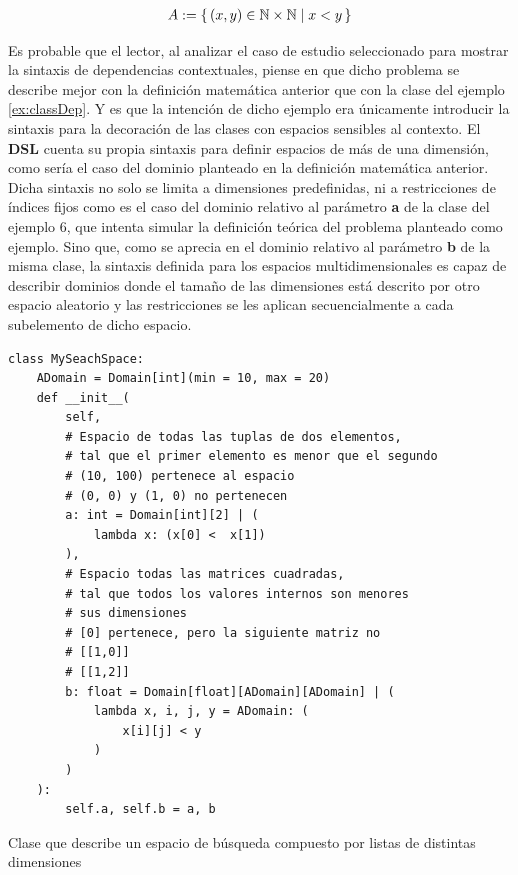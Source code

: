\begin{align*}
    A := \{\,(x, y) \in \mathbb{N} \times \mathbb{N}\mid x < y\,\} \\
\end{align*}

Es probable que el lector, al analizar el caso de estudio seleccionado para mostrar la sintaxis de dependencias
contextuales, piense en que dicho problema se describe mejor con la definición matemática anterior que con la
clase del ejemplo \ref{ex:classDep}. Y es que la intención de dicho ejemplo era únicamente introducir la sintaxis para la decoración
de las clases con espacios sensibles al contexto. El {\bf DSL} cuenta su propia sintaxis para definir espacios de más
de una dimensión, como sería el caso del dominio planteado en la definición matemática anterior. Dicha sintaxis
no solo se limita a dimensiones predefinidas, ni a restricciones de índices fijos como es el caso del dominio relativo
al parámetro {\bf a} de la clase del ejemplo 6, que intenta simular la definición teórica del problema planteado como ejemplo.
Sino que, como se aprecia en el dominio relativo al parámetro {\bf b} de la misma clase, la sintaxis definida para los espacios
multidimensionales es capaz de describir dominios donde el tamaño de las dimensiones está descrito por otro espacio
aleatorio y las restricciones se les aplican secuencialmente a cada subelemento de dicho espacio.


\begin{listing}[!ht]
    \begin{verbatim}
class MySeachSpace:
    ADomain = Domain[int](min = 10, max = 20)
    def __init__(
        self, 
        # Espacio de todas las tuplas de dos elementos,
        # tal que el primer elemento es menor que el segundo
        # (10, 100) pertenece al espacio
        # (0, 0) y (1, 0) no pertenecen
        a: int = Domain[int][2] | (
            lambda x: (x[0] <  x[1])
        ),
        # Espacio todas las matrices cuadradas, 
        # tal que todos los valores internos son menores 
        # sus dimensiones 
        # [0] pertenece, pero la siguiente matriz no 
        # [[1,0]]  
        # [[1,2]]
        b: float = Domain[float][ADomain][ADomain] | (
            lambda x, i, j, y = ADomain: (
                x[i][j] < y
            )
        )
    ):
        self.a, self.b = a, b

    \end{verbatim}
    \caption{Clase que describe un espacio de búsqueda compuesto por listas de distintas dimensiones }
    \label{ex:classList}
\end{listing}

